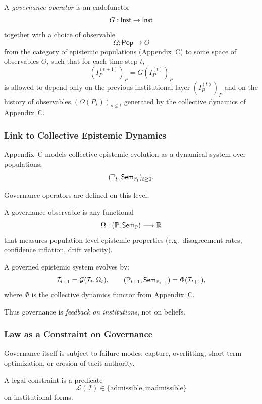\begin{definition}\label{def:F1-governance}
A \emph{governance operator} is an endofunctor
\[
  G : \mathsf{Inst} \to \mathsf{Inst}
\]
together with a choice of observable
\[
  \Omega : \mathsf{Pop} \to O
\]
from the category of epistemic populations (Appendix~C) to some space of observables $O$, such that for each time step $t$,
\[
  (I^{(t+1)}_P)_P = G(I^{(t)}_P)_P
\]
is allowed to depend only on the previous institutional layer $(I^{(t)}_P)_P$ and on the history of observables $(\Omega(P_s))_{s \le t}$ generated by the collective dynamics of Appendix~C.
\end{definition}


\subsubsection{Link to Collective Epistemic Dynamics}

Appendix~C models collective epistemic evolution as a dynamical system over
populations:
\[
(\mathbb{P}_t, \mathsf{Sem}_{\mathbb{P}_t})_{t \ge 0}.
\]

Governance operators are defined on this level.

\begin{definition}
A governance observable is any functional
\[
\Omega : (\mathbb{P}, \mathsf{Sem}_{\mathbb{P}}) \longrightarrow \mathbb{R}
\]
that measures population-level epistemic properties (e.g.\ disagreement
rates, confidence inflation, drift velocity).
\end{definition}

\begin{definition}
A governed epistemic system evolves by:
\[
\mathcal{I}_{t+1} = \mathcal{G}(\mathcal{I}_t, \Omega_t),
\qquad
(\mathbb{P}_{t+1}, \mathsf{Sem}_{\mathbb{P}_{t+1}}) = \Phi(\mathcal{I}_{t+1}),
\]
where $\Phi$ is the collective dynamics functor from Appendix~C.
\end{definition}

Thus governance is \emph{feedback on institutions}, not on beliefs.

\subsubsection{Law as a Constraint on Governance}

Governance itself is subject to failure modes: capture, overfitting,
short-term optimization, or erosion of tacit authority.

\begin{definition}
A legal constraint is a predicate
\[
\mathcal{L}(\mathcal{I}) \in \{\text{admissible},\text{inadmissible}\}
\]
on institutional forms.
\end{definition}

